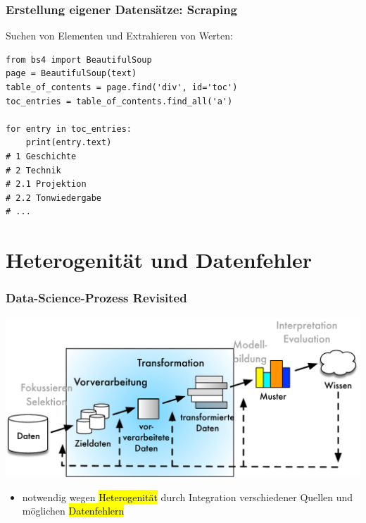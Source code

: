 \begin{frame}[fragile]
\frametitle{Erstellung eigener Datensätze: Scraping}

Suchen von Elementen und Extrahieren von Werten:

\begin{verbatim}
from bs4 import BeautifulSoup
page = BeautifulSoup(text)
table_of_contents = page.find('div', id='toc')
toc_entries = table_of_contents.find_all('a')

for entry in toc_entries:
    print(entry.text)
# 1 Geschichte
# 2 Technik
# 2.1 Projektion
# 2.2 Tonwiedergabe
# ...
\end{verbatim}
\end{frame}


\section{Heterogenität und Datenfehler}



\begin{frame}
    \frametitle{Data-Science-Prozess Revisited}
    
    \begin{center}
    \includegraphics[scale=.6]{fig4/kdd-prozess.pdf}
    \end{center}
    
    \begin{itemize}
    \item notwendig wegen \hl{Heterogenität} durch Integration
      verschiedener Quellen und möglichen \hl{Datenfehlern}
    \end{itemize}
    
\end{frame}
    
